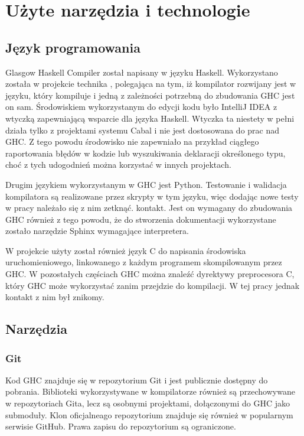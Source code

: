 \chapter{Użyte narzędzia i technologie}\label{chap:technologie}

\section{Język programowania}\label{sec:jezyk_programowania}

Glasgow Haskell Compiler został napisany w języku Haskell. Wykorzystano została w projekcie technika , polegająca na tym, iż kompilator rozwijany jest w języku, który kompiluje i jedną z zależności potrzebną do zbudowania GHC jest on sam. Środowiskiem wykorzystanym do edycji kodu było IntelliJ IDEA z wtyczką zapewniającą wsparcie dla języka Haskell. Wtyczka ta niestety w pełni działa tylko z projektami systemu Cabal i nie jest dostosowana do prac nad GHC. Z tego powodu środowisko nie zapewniało na przykład ciągłego raportowania błędów w kodzie lub wyszukiwania deklaracji określonego typu, choć z tych udogodnień można korzystać w innych projektach.

Drugim językiem wykorzystanym w GHC jest Python. Testowanie i walidacja kompilatora są realizowane przez skrypty w tym języku, więc dodając nowe testy w pracy należało się z nim zetknąć. kontakt. Jest on wymagany do zbudowania GHC również z tego powodu, że do stworzenia dokumentacji wykorzystane zostało narzędzie Sphinx wymagające interpretera.

W projekcie użyty został również język C do napisania środowiska uruchomieniowego, linkowanego z każdym programem skompilowanym przez GHC. W pozostałych częściach GHC można znaleźć dyrektywy preprocesora C, który GHC może wykorzystać zanim przejdzie do kompilacji. W tej pracy jednak kontakt z nim był znikomy.

\section{Narzędzia}

\subsection{Git}

Kod GHC znajduje się w repozytorium Git i jest publicznie dostępny do pobrania. Biblioteki wykorzystywane w kompilatorze również są przechowywane w repozytoriach Gita, lecz są osobnymi projektami, dołączonymi do GHC jako submoduły. Klon oficjalneago repozytorium znajduje się również w popularnym serwisie GitHub. Prawa zapisu do repozytorium są ograniczone\cite{WikiGettingTheSources}.

